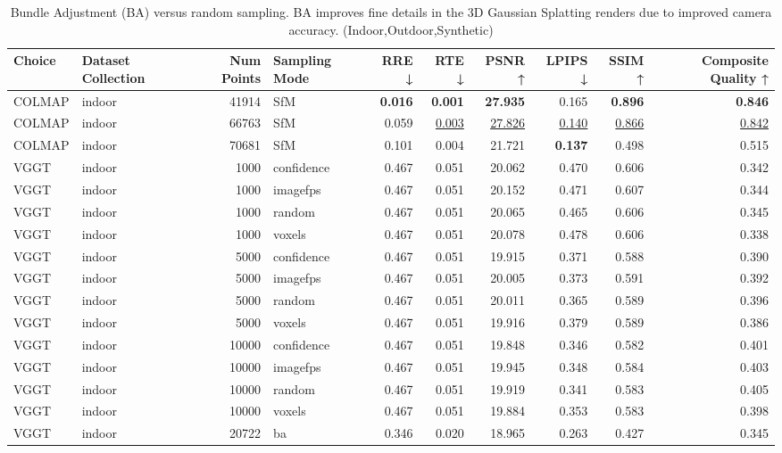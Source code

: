\begin{table}[H]
\caption{\ifdefined\customcaption \customcaption \else Bundle Adjustment (BA) versus random sampling. BA improves fine details in the 3D Gaussian Splatting renders due to improved camera accuracy. (Indoor,Outdoor,Synthetic) \fi}
\label{tab:03_sampling_mode_ba_indoor,outdoor,synthetic}
\centering
\tiny
\begin{tabular}{llrlrrrrrr}
\toprule
Choice & Dataset Collection & Num Points & Sampling Mode & RRE ↓ & RTE ↓ & PSNR ↑ & LPIPS ↓ & SSIM ↑ & Composite Quality ↑ \\
\midrule
COLMAP & indoor & 41914 & SfM & \textbf{0.016} & \textbf{0.001} & \textbf{27.935} & 0.165 & \textbf{0.896} & \textbf{0.846} \\
COLMAP & indoor & 66763 & SfM & 0.059 & \underline{0.003} & \underline{27.826} & \underline{0.140} & \underline{0.866} & \underline{0.842} \\
COLMAP & indoor & 70681 & SfM & 0.101 & 0.004 & 21.721 & \textbf{0.137} & 0.498 & 0.515 \\
VGGT & indoor & 1000 & confidence & 0.467 & 0.051 & 20.062 & 0.470 & 0.606 & 0.342 \\
VGGT & indoor & 1000 & imagefps & 0.467 & 0.051 & 20.152 & 0.471 & 0.607 & 0.344 \\
VGGT & indoor & 1000 & random & 0.467 & 0.051 & 20.065 & 0.465 & 0.606 & 0.345 \\
VGGT & indoor & 1000 & voxels & 0.467 & 0.051 & 20.078 & 0.478 & 0.606 & 0.338 \\
VGGT & indoor & 5000 & confidence & 0.467 & 0.051 & 19.915 & 0.371 & 0.588 & 0.390 \\
VGGT & indoor & 5000 & imagefps & 0.467 & 0.051 & 20.005 & 0.373 & 0.591 & 0.392 \\
VGGT & indoor & 5000 & random & 0.467 & 0.051 & 20.011 & 0.365 & 0.589 & 0.396 \\
VGGT & indoor & 5000 & voxels & 0.467 & 0.051 & 19.916 & 0.379 & 0.589 & 0.386 \\
VGGT & indoor & 10000 & confidence & 0.467 & 0.051 & 19.848 & 0.346 & 0.582 & 0.401 \\
VGGT & indoor & 10000 & imagefps & 0.467 & 0.051 & 19.945 & 0.348 & 0.584 & 0.403 \\
VGGT & indoor & 10000 & random & 0.467 & 0.051 & 19.919 & 0.341 & 0.583 & 0.405 \\
VGGT & indoor & 10000 & voxels & 0.467 & 0.051 & 19.884 & 0.353 & 0.583 & 0.398 \\
VGGT & indoor & 20722 & ba & 0.346 & 0.020 & 18.965 & 0.263 & 0.427 & 0.345 \\

\end{tabular}
\end{table}
